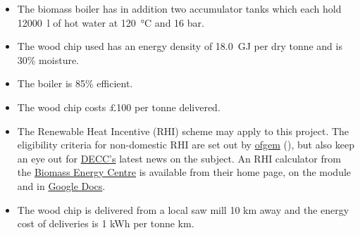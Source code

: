 \documentclass[parskip=half]{scrartcl}
\begin{document}
\begin{itemize}
\item The biomass boiler has in addition two accumulator tanks which each hold \SI{12000}{\litre} of hot water at  \SI{120}{\celsius} and 16 bar.

\item The wood chip used has an energy density of \SI{18.0}{\giga\joule} per dry tonne and is 30\% moisture.

\item The boiler is 85\% efficient. 

\item The wood chip costs £100 per tonne delivered.

\item The Renewable Heat Incentive (RHI) scheme may apply to this project. The eligibility criteria for non-domestic RHI are set out by \href{https://www.ofgem.gov.uk/environmental-programmes/non-domestic-renewable-heat-incentive-rhi/eligibility-non-domestic-rhi}{ofgem} (\cite{ofgem}), but also keep an eye out for \href{https://www.gov.uk/government/policies/increasing-the-use-of-low-carbon-technologies/supporting-pages/renewable-heat-incentive-rhi}{DECC's} latest news on the subject. An RHI calculator from the \href{http://www.biomassenergycentre.org.uk/portal/page?_pageid=73,1&_dad=portal&_schema=PORTAL}{Biomass Energy Centre} is available from their home page, on the module and in \href{https://docs.google.com/spreadsheet/ccc?key=0AnLADLTFXDf5dENTeWEydV9OZXZaVk4zV09zcWFnLVE&usp=drive_web#gid=0}{Google Docs}.

\item The wood chip is delivered from a local saw mill 10 km away and the energy cost of deliveries is 1 kWh per tonne km.
\end{itemize}
\end{document}
